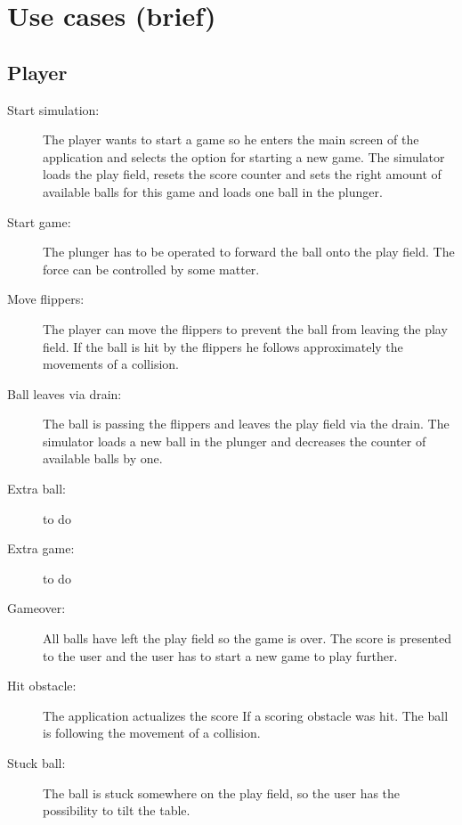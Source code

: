 \documentclass[fontsize=12pt,
               paper=a4,
               twoside=false,
               parskip=half,
               ]{scrartcl}
\begin{document}


\section{Use cases (brief)}

\subsection{Player}

\begin{description}

\item[Start simulation:]   The player wants to start a game so he enters the main screen of the application and selects the option for starting a new game. The simulator loads the play field, resets the score counter and sets the right amount of available balls for this game and loads one ball in the plunger.

\item[Start game:] The plunger has to be operated to forward the ball onto the play field.  The force can be controlled by some matter.

\item[Move flippers:] The player can move the flippers to prevent the ball from leaving the play field. If the ball is hit by the flippers he follows approximately the movements of a collision.

\item[Ball leaves via drain:] The ball is passing the flippers and leaves the play field via the drain. The simulator loads a new ball in the plunger and decreases the counter of available balls by one.

\item[Extra ball:] 
to do

\item[Extra game:]
to do

\item[Gameover:] All balls have left the play field so the game is over. The score is presented to the user and the user has to start a new game to play further.

\item[Hit obstacle:] The application actualizes the score If a scoring obstacle  was hit. The ball is following the movement of a collision.

\item[Stuck ball:] The ball is stuck somewhere on the play field, so the user has the possibility to tilt the table.


\end{description}
\end{document}
